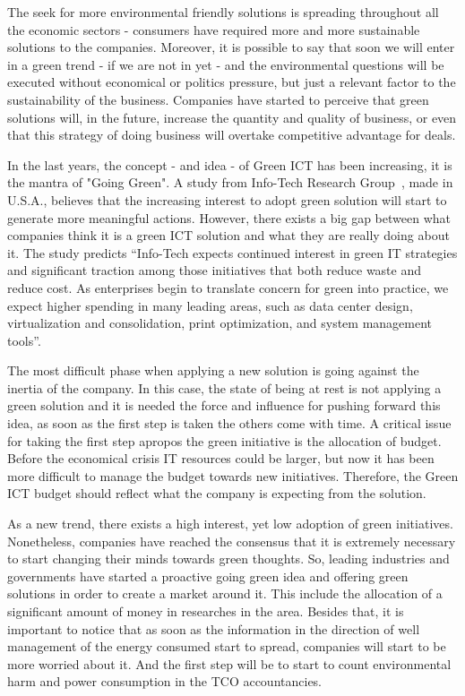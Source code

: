     The seek for more environmental friendly solutions is spreading throughout all the economic sectors - consumers have required more and more sustainable solutions to the companies. Moreover, it is possible to say that soon we will enter in a green trend - if we are not in yet - and the environmental questions will be executed without economical or politics pressure, but just a relevant factor to the sustainability of the business. Companies have started to perceive that green solutions will, in the future, increase the quantity and quality of business, or even that this strategy of doing business will overtake competitive advantage for deals.
        
    In the last years, the concept - and idea - of Green ICT has been increasing, it is the mantra of "Going Green". A study from Info-Tech Research Group~\cite{info-tech07}, made in U.S.A., believes that the increasing interest to adopt green solution will start to generate more meaningful actions. However, there exists a big gap between what companies think it is a green ICT solution and what they are really doing about it. The study predicts ``Info-Tech expects continued interest in green IT strategies and significant traction among those initiatives that both reduce waste and reduce cost. As enterprises begin to translate concern for green into practice, we expect higher spending in many leading areas, such as data center design, virtualization and
consolidation, print optimization, and system management tools''.
	
	The most difficult phase when applying a new solution is going against the inertia of the company. In this case, the state of being at rest is not applying a green solution and it is needed the force and influence for pushing forward this idea, as soon as the first step is taken the others come with time. A critical issue for taking the first step apropos the green initiative is the allocation of budget. Before the economical crisis IT resources could be larger, but now it has been more difficult to manage the budget towards new initiatives. Therefore, the Green ICT budget should reflect what the company is expecting from the solution.
	
	As a new trend, there exists a high interest, yet low adoption of green initiatives. Nonetheless, companies have reached the consensus that it is extremely necessary to start changing their minds towards green thoughts. So, leading industries and governments have started a proactive going green idea and offering green solutions in order to create a market around it. This include the allocation of a significant amount of money in researches in the area. Besides that, it is important to notice that as soon as the information in the direction of well management of the energy consumed start to spread, companies will start to be more worried about it. And the first step will be to start to count environmental harm and power consumption in the TCO accountancies.
	
